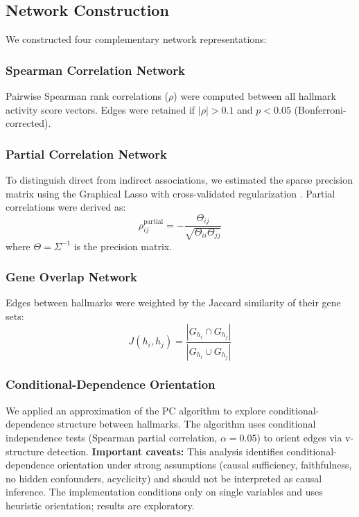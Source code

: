 \documentclass[11pt,a4paper]{article}
\begin{document}
\subsection{Network Construction}

We constructed four complementary network representations:

\subsubsection{Spearman Correlation Network}
Pairwise Spearman rank correlations ($\rho$) were computed between all hallmark activity score vectors. Edges were retained if $|\rho| > 0.1$ and $p < 0.05$ (Bonferroni-corrected).

\subsubsection{Partial Correlation Network}
To distinguish direct from indirect associations, we estimated the sparse precision matrix using the Graphical Lasso with cross-validated regularization \citep{friedman2008sparse}. Partial correlations were derived as:
\begin{equation}
    \rho_{ij}^{\text{partial}} = -\frac{\Theta_{ij}}{\sqrt{\Theta_{ii}\Theta_{jj}}}
\end{equation}
where $\Theta = \Sigma^{-1}$ is the precision matrix.

\subsubsection{Gene Overlap Network}
Edges between hallmarks were weighted by the Jaccard similarity of their gene sets:
\begin{equation}
    J(h_i, h_j) = \frac{|G_{h_i} \cap G_{h_j}|}{|G_{h_i} \cup G_{h_j}|}
\end{equation}

\subsubsection{Conditional-Dependence Orientation}
We applied an approximation of the PC algorithm \citep{spirtes2000causation} to explore conditional-dependence structure between hallmarks. The algorithm uses conditional independence tests (Spearman partial correlation, $\alpha = 0.05$) to orient edges via v-structure detection. \textbf{Important caveats:} This analysis identifies conditional-dependence orientation under strong assumptions (causal sufficiency, faithfulness, no hidden confounders, acyclicity) and should not be interpreted as causal inference. The implementation conditions only on single variables and uses heuristic orientation; results are exploratory.
\end{document}
